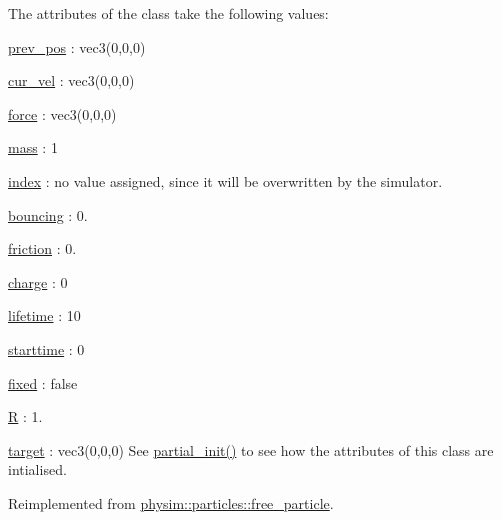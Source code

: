 The attributes of the class take the following values\+:
\begin{DoxyItemize}
\item \hyperlink{classphysim_1_1particles_1_1base__particle_a08072db6a1a59d21acc9cac6ac8965f7}{prev\+\_\+pos} \+: vec3(0,0,0)
\item \hyperlink{classphysim_1_1particles_1_1base__particle_a66a164d2a130c40901e3ec2709cdad43}{cur\+\_\+vel} \+: vec3(0,0,0)
\item \hyperlink{classphysim_1_1particles_1_1base__particle_adc3b11899d2e50970ae5d4931721a0ef}{force} \+: vec3(0,0,0)
\item \hyperlink{classphysim_1_1particles_1_1base__particle_acb5c9f0b4a911d8981210e2cfc4dda8a}{mass} \+: 1
\item \hyperlink{classphysim_1_1particles_1_1base__particle_a44f5de3bb4b860dfd511e28e1d6519d5}{index} \+: no value assigned, since it will be overwritten by the simulator.
\item \hyperlink{classphysim_1_1particles_1_1free__particle_aac766fa5294e47b944d32ca3e38d47fa}{bouncing} \+: 0.
\item \hyperlink{classphysim_1_1particles_1_1free__particle_a9e7dfd81e9392fc42b3faecb57afdc02}{friction} \+: 0.
\item \hyperlink{classphysim_1_1particles_1_1free__particle_a7513ac41f3cab1ce083f8695e2c73301}{charge} \+: 0
\item \hyperlink{classphysim_1_1particles_1_1free__particle_a5870d6fd3167d2c6120f887f45fe50fc}{lifetime} \+: 10
\item \hyperlink{classphysim_1_1particles_1_1free__particle_ad0379ba926ecc909bfbfb373045bfcf9}{starttime} \+: 0
\item \hyperlink{classphysim_1_1particles_1_1free__particle_a0f6d69caeac140abd74c7be4ed55eb74}{fixed} \+: false
\item \hyperlink{classphysim_1_1particles_1_1sized__particle_ac67d5df84b91bb12152c8691dd43e98c}{R} \+: 1.
\item \hyperlink{classphysim_1_1particles_1_1agent__particle_a0658207e11a5d39844856233ae8bf2cb}{target} \+: vec3(0,0,0) See \hyperlink{classphysim_1_1particles_1_1agent__particle_af48f594a16ab6c2ff3b475fa7f64266c}{partial\+\_\+init()} to see how the attributes of this class are intialised. 
\end{DoxyItemize}

Reimplemented from \hyperlink{classphysim_1_1particles_1_1free__particle_a0df21e64a28c5fdf471d54a50b59fea3}{physim\+::particles\+::free\+\_\+particle}.

